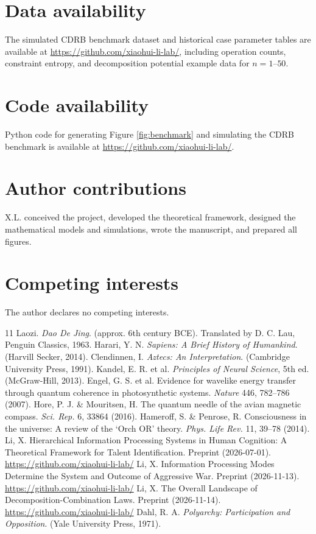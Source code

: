 \documentclass[11pt,a4paper]{article}
\begin{document}
\section*{Data availability}

The simulated CDRB benchmark dataset and historical case parameter tables are available at \url{https://github.com/xiaohui-li-lab/}, including operation counts, constraint entropy, and decomposition potential example data for $n = 1$--$50$.

\section*{Code availability}

Python code for generating Figure \ref{fig:benchmark} and simulating the CDRB benchmark is available at \url{https://github.com/xiaohui-li-lab/}.

\section*{Author contributions}

X.L. conceived the project, developed the theoretical framework, designed the mathematical models and simulations, wrote the manuscript, and prepared all figures.

\section*{Competing interests}

The author declares no competing interests.

\begin{thebibliography}{11}
 Laozi. \textit{Dao De Jing}. (approx. 6th century BCE). Translated by D. C. Lau, Penguin Classics, 1963.
 Harari, Y. N. \textit{Sapiens: A Brief History of Humankind}. (Harvill Secker, 2014).
 Clendinnen, I. \textit{Aztecs: An Interpretation}. (Cambridge University Press, 1991).
 Kandel, E. R. et al. \textit{Principles of Neural Science}, 5th ed. (McGraw-Hill, 2013).
 Engel, G. S. et al. Evidence for wavelike energy transfer through quantum coherence in photosynthetic systems. \textit{Nature} 446, 782--786 (2007).
 Hore, P. J. \& Mouritsen, H. The quantum needle of the avian magnetic compass. \textit{Sci. Rep.} 6, 33864 (2016).
 Hameroff, S. \& Penrose, R. Consciousness in the universe: A review of the `Orch OR' theory. \textit{Phys. Life Rev.} 11, 39--78 (2014).
 Li, X. Hierarchical Information Processing Systems in Human Cognition: A Theoretical Framework for Talent Identification. Preprint (2026-07-01). \url{https://github.com/xiaohui-li-lab/}
 Li, X. Information Processing Modes Determine the System and Outcome of Aggressive War. Preprint (2026-11-13). \url{https://github.com/xiaohui-li-lab/}
 Li, X. The Overall Landscape of Decomposition-Combination Laws. Preprint (2026-11-14). \url{https://github.com/xiaohui-li-lab/}
 Dahl, R. A. \textit{Polyarchy: Participation and Opposition}. (Yale University Press, 1971).
\end{thebibliography}
\end{document}
